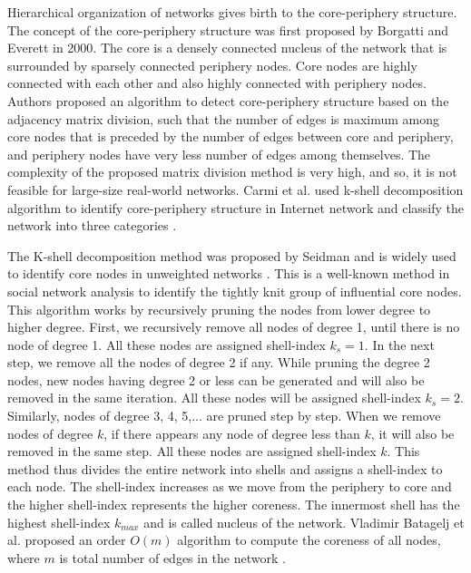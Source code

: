 \documentclass[12pt,3p]{article}
\begin{document}

Hierarchical organization of networks gives birth to the core-periphery structure. The concept of the core-periphery structure was first proposed by Borgatti and Everett \cite{borgatti2000models} in 2000. The core is a densely connected nucleus of the network that is surrounded by sparsely connected periphery nodes. Core nodes are highly connected with each other and also highly connected with periphery nodes. Authors proposed an algorithm to detect core-periphery structure based on the adjacency matrix division, such that the number of edges is maximum among core nodes that is preceded by the number of edges between core and periphery, and periphery nodes have very less number of edges among themselves. The complexity of the proposed matrix division method is very high, and so, it is not feasible for large-size real-world networks. Carmi et al. used k-shell decomposition algorithm to identify core-periphery structure in Internet network and classify the network into three categories \cite{carmi2007model}. %



The K-shell decomposition method was proposed by Seidman and is widely used to identify core nodes in unweighted networks \cite{seidman1983network}. This is a well-known method in social network analysis to identify the tightly knit group of influential core nodes. This algorithm works by recursively pruning the nodes from lower degree to higher degree. First, we recursively remove all nodes of degree 1, until there is no node of degree 1. All these nodes are assigned shell-index $k_s=1$. In the next step, we remove all the nodes of degree 2 if any. While pruning the degree 2 nodes, new nodes having degree 2 or less can be generated and will also be removed in the same iteration. All these nodes will be assigned shell-index $k_s=2$. Similarly, nodes of degree 3, 4, 5,... are pruned step by step. When we remove nodes of degree $k$, if there appears any node of degree less than $k$, it will also be removed in the same step. All these nodes are assigned shell-index $k$. This method thus divides the entire network into shells and assigns a shell-index to each node. The shell-index increases as we move from the periphery to core and the higher shell-index represents the higher coreness. The innermost shell has the highest shell-index $k_{max}$ and is called nucleus of the network. Vladimir Batagelj et al. proposed an order $O(m)$ algorithm to compute the coreness of all nodes, where $m$ is total number of edges in the network \cite{batagelj2011fast}.
\end{document}
